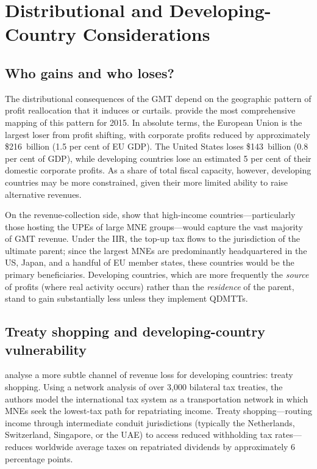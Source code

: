 \documentclass[12pt,a4paper]{article}
\begin{document}
\section{Distributional and Developing-Country Considerations}\label{sec:distribution}

\subsection{Who gains and who loses?}

The distributional consequences of the GMT depend on the geographic pattern of profit reallocation that it induces or curtails.
\textcite{torslov2022} provide the most comprehensive mapping of this pattern for 2015.
In absolute terms, the European Union is the largest loser from profit shifting, with corporate profits reduced by approximately \$216~billion (1.5 per cent of EU GDP).
The United States loses \$143~billion (0.8 per cent of GDP), while developing countries lose an estimated 5 per cent of their domestic corporate profits.
As a share of total fiscal capacity, however, developing countries may be more constrained, given their more limited ability to raise alternative revenues.

On the revenue-collection side, \textcite{barake2022} show that high-income countries---particularly those hosting the UPEs of large MNE groups---would capture the vast majority of GMT revenue.
Under the IIR, the top-up tax flows to the jurisdiction of the ultimate parent; since the largest MNEs are predominantly headquartered in the US, Japan, and a handful of EU member states, these countries would be the primary beneficiaries.
Developing countries, which are more frequently the \emph{source} of profits (where real activity occurs) rather than the \emph{residence} of the parent, stand to gain substantially less unless they implement QDMTTs.

\subsection{Treaty shopping and developing-country vulnerability}

\textcite{vantriet2025} analyse a more subtle channel of revenue loss for developing countries: treaty shopping.
Using a network analysis of over 3{,}000 bilateral tax treaties, the authors model the international tax system as a transportation network in which MNEs seek the lowest-tax path for repatriating income.
Treaty shopping---routing income through intermediate conduit jurisdictions (typically the Netherlands, Switzerland, Singapore, or the UAE) to access reduced withholding tax rates---reduces worldwide average taxes on repatriated dividends by approximately 6 percentage points.
\end{document}
